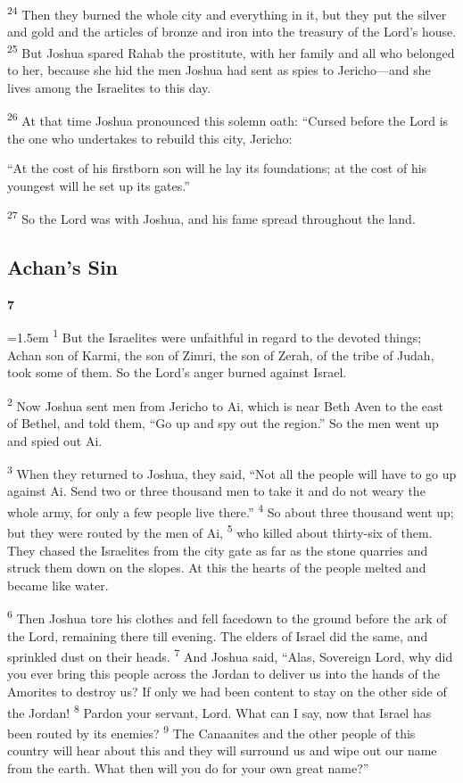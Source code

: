 \documentclass[12pt,twoside]{article}
\newcommand{\vs}[1]{\textsuperscript{#1}}
\newcommand{\chapterWithIndent}[2]{%
  \noindent
  \begin{minipage}[t]{1cm}
    \vspace{-0.4\baselineskip}
    {\fontsize{40pt}{48pt}\selectfont \textbf{#1}}
  \end{minipage}%
  \hspace{0.3cm}%
  \begin{minipage}[t]{\dimexpr\linewidth - 1.5cm - 0.3cm\relax}
    \hangindent=1.5em
    \hangafter=3
    #2
    \vspace{0.1cm}
  \end{minipage}
}
\begin{document}
\vs{24} Then they burned the whole city and everything in it, but they put the silver and gold and the articles of bronze and iron into the treasury of the Lord's house.
\vs{25} But Joshua spared Rahab the prostitute, with her family and all who belonged to her, because she hid the men Joshua had sent as spies to Jericho---and she lives among the Israelites to this day.

\vs{26} At that time Joshua pronounced this solemn oath: ``Cursed before the Lord is the one who undertakes to rebuild this city, Jericho:

\indent ``At the cost of his firstborn son will he lay its foundations; at the cost of his youngest will he set up its gates.''

\vs{27} So the Lord was with Joshua, and his fame spread throughout the land.

\subsection*{\textbf{Achan's Sin}}
\chapterWithIndent{7}{%
  \vs{1} But the Israelites were unfaithful in regard to the devoted things; Achan son of Karmi, the son of Zimri, the son of Zerah, of the tribe of Judah, took some of them. So the Lord's anger burned against Israel.
}

\vs{2} Now Joshua sent men from Jericho to Ai, which is near Beth Aven to the east of Bethel, and told them, ``Go up and spy out the region.'' So the men went up and spied out Ai.

\vs{3} When they returned to Joshua, they said, ``Not all the people will have to go up against Ai. Send two or three thousand men to take it and do not weary the whole army, for only a few people live there.''
\vs{4} So about three thousand went up; but they were routed by the men of Ai,
\vs{5} who killed about thirty-six of them. They chased the Israelites from the city gate as far as the stone quarries and struck them down on the slopes. At this the hearts of the people melted and became like water.

\vs{6} Then Joshua tore his clothes and fell facedown to the ground before the ark of the Lord, remaining there till evening. The elders of Israel did the same, and sprinkled dust on their heads.
\vs{7} And Joshua said, ``Alas, Sovereign Lord, why did you ever bring this people across the Jordan to deliver us into the hands of the Amorites to destroy us? If only we had been content to stay on the other side of the Jordan!
\vs{8} Pardon your servant, Lord. What can I say, now that Israel has been routed by its enemies?
\vs{9} The Canaanites and the other people of this country will hear about this and they will surround us and wipe out our name from the earth. What then will you do for your own great name?''
\end{document}
